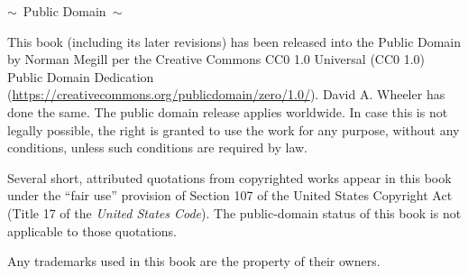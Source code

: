 \vfill
\hfill

\newpage
\thispagestyle{empty}

\hfill
\vfill

\begin{center}
$\sim$\ {\sc Public Domain}\ $\sim$

\vspace{2ex}
This book (including its later revisions)
has been released into the Public Domain by Norman Megill per the
Creative Commons CC0 1.0 Universal (CC0 1.0) Public Domain Dedication
(\url{https://creativecommons.org/publicdomain/zero/1.0/}).
David A. Wheeler has done the same.
The public domain release applies worldwide.  In case this is not
legally possible, the right is granted to use the work for any purpose,
without any conditions, unless such conditions are required by law.

\vspace{3ex}
Several short, attributed quotations from copyrighted works
appear in this book under the ``fair use'' provision of Section 107 of
the United States Copyright Act (Title 17 of the {\em United States
Code}).  The public-domain status of this book is not applicable to
those quotations.

\vspace{3ex}
Any trademarks used in this book are the property of their owners.


%
%
%
%


\end{center}
